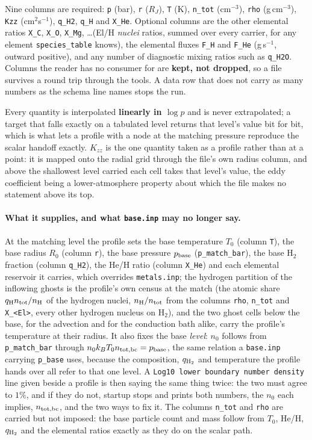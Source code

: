 \documentclass[english,a4paper]{my_memo}
\begin{document}
Nine columns are required: \texttt{p} (bar), \texttt{r} ($R_J$), \texttt{T}
(K), \texttt{n\_tot} (cm$^{-3}$), \texttt{rho} (g\,cm$^{-3}$), \texttt{Kzz}
(cm$^2$s$^{-1}$), \texttt{q\_H2}, \texttt{q\_H} and \texttt{X\_He}. Optional
columns are the other elemental ratios \texttt{X\_C}, \texttt{X\_O},
\texttt{X\_Mg}, \ldots (El/H \emph{nuclei} ratios, summed over every carrier,
for any element \texttt{species\_table} knows), the elemental fluxes
\texttt{F\_H} and \texttt{F\_He} (g\,s$^{-1}$, outward positive), and any
number of diagnostic mixing ratios such as \texttt{q\_H2O}. Columns the reader
has no consumer for are \textbf{kept, not dropped}, so a file survives a round
trip through the tools. A data row that does not carry as many numbers as the
schema line names stops the run.

Every quantity is interpolated \textbf{linearly in $\log p$} and is never
extrapolated; a target that falls exactly on a tabulated level returns that
level's value bit for bit, which is what lets a profile with a node at the
matching pressure reproduce the scalar handoff exactly. $K_{zz}$ is the one
quantity taken as a profile rather than at a point: it is mapped onto the
radial grid through the file's own radius column, and above the shallowest
level carried each cell takes that level's value, the eddy coefficient being a
lower-atmosphere property about which the file makes no statement above its
top.

\paragraph{What it supplies, and what \texttt{base.inp} may no longer say.}
At the matching level the profile sets the base temperature $T_0$ (column
\texttt{T}), the base radius $R_0$ (column \texttt{r}), the base pressure
$p_{\rm base}$ (\texttt{p\_match\_bar}), the base H$_2$ fraction (column
\texttt{q\_H2}), the He/H ratio (column \texttt{X\_He}) and each elemental
reservoir it carries, which overrides \texttt{metals.inp}; the hydrogen
partition of the inflowing ghosts is the profile's own census at the match
(the atomic share $q_{\rm H}n_{\rm tot}/n_{\rm H}$ of the hydrogen nuclei,
$n_{\rm H}/n_{\rm tot}$ from the columns \texttt{rho}, \texttt{n\_tot} and
\texttt{X\_<El>}, every other hydrogen nucleus on H$_2$), and the two
ghost cells below the base, for the advection and for the conduction bath
alike, carry the profile's temperature at their radius. It also fixes the
base \emph{level}: $n_0$ follows from \texttt{p\_match\_bar} through
$n_0k_BT_0n_{\rm tot,bc}=p_{\rm base}$, the same relation a \texttt{base.inp}
carrying \texttt{p\_base} uses, because the composition, $q_{\rm H_2}$ and
temperature the profile hands over all refer to that one level. A
\texttt{Log10 lower boundary number density} line given beside a profile is
then saying the same thing twice: the two must agree to $1\%$, and if they do
not, startup stops and prints both numbers, the $n_0$ each implies,
$n_{\rm tot,bc}$, and the two ways to fix it. The columns \texttt{n\_tot} and
\texttt{rho} are carried but not imposed: the base particle count and mass
follow from $T_0$, He/H, $q_{\rm H_2}$ and the elemental ratios exactly as
they do on the scalar path.
\end{document}
